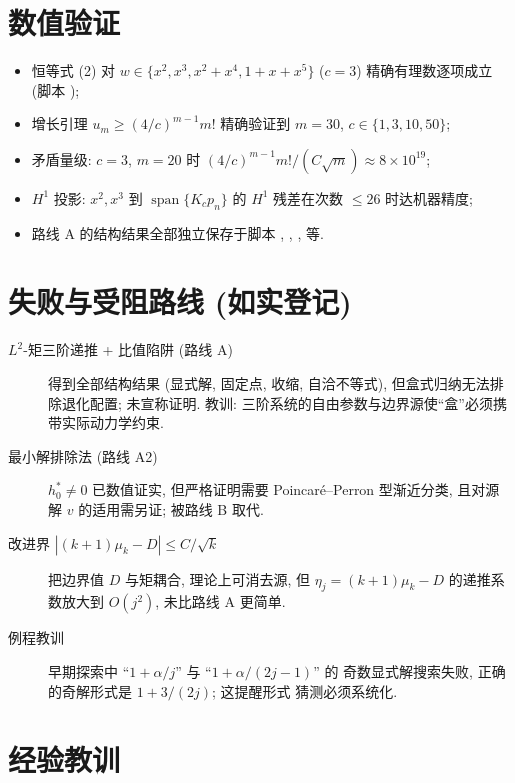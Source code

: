 \documentclass[UTF8]{ctexart}
\begin{document}
\section{数值验证}

\begin{itemize}
	\item 恒等式 (2) 对 $w \in \{x^2, x^3, x^2+x^4, 1+x+x^5\}$ ($c=3$)
		精确有理数逐项成立 (脚本 );
	\item 增长引理 $u_m \geq (4/c)^{m-1} m!$ 精确验证到 $m=30$,
		$c \in \{1,3,10,50\}$;
	\item 矛盾量级: $c=3$, $m=20$ 时 $(4/c)^{m-1}m!/(C\sqrt m) \approx
		8\times10^{19}$;
	\item $H^1$ 投影: $x^2, x^3$ 到 $\operatorname{span}\{K_c p_n\}$ 的 $H^1$
		残差在次数 $\leq 26$ 时达机器精度;
	\item 路线 A 的结构结果全部独立保存于脚本
		, ,
		,  等.
\end{itemize}

\section{失败与受阻路线 (如实登记)}

\begin{description}
	\item[$L^2$-矩三阶递推 + 比值陷阱 (路线 A)] 得到全部结构结果 (显式解,
		固定点, 收缩, 自洽不等式), 但盒式归纳无法排除退化配置; 未宣称证明.
		教训: 三阶系统的自由参数与边界源使``盒''必须携带实际动力学约束.
	\item[最小解排除法 (路线 A2)] $h^*_0 \neq 0$ 已数值证实, 但严格证明需要
		Poincar\'e--Perron 型渐近分类, 且对源解 $v$ 的适用需另证; 被路线 B
		取代.
	\item[改进界 $|(k+1)\mu_k - D| \leq C/\sqrt{k}$] 把边界值 $D$ 与矩耦合,
		理论上可消去源, 但 $\eta_j = (k+1)\mu_k - D$ 的递推系数放大到
		$O(j^2)$, 未比路线 A 更简单.
	\item[例程教训] 早期探索中 ``$1+\alpha/j$'' 与 ``$1+\alpha/(2j-1)$'' 的
		奇数显式解搜索失败, 正确的奇解形式是 $1 + 3/(2j)$; 这提醒形式
		猜测必须系统化.
\end{description}

\section{经验教训}
\end{document}
